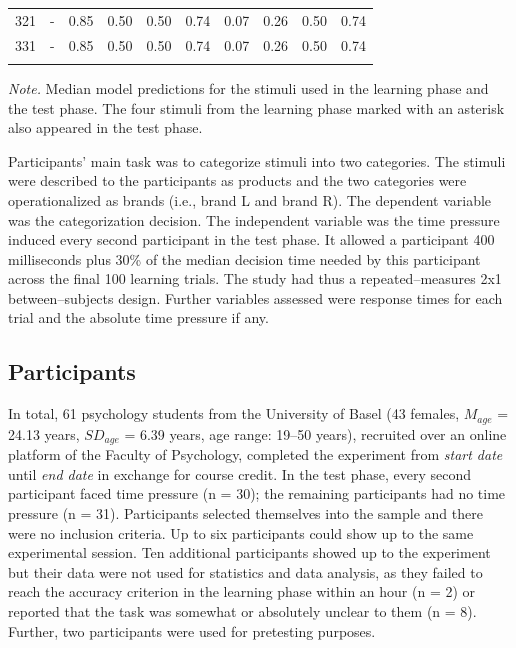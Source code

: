 \documentclass[a4paper,man,natbib]{apa6}
\begin{document}
\begin{table}
\begin{center}
\begin{threeparttable}
\begin{tabular}{cccccccccc}
321 & - & 0.85 & 0.50 & 0.50 & 0.74 & 0.07 & 0.26 & 0.50 & 0.74\\
331 & - & 0.85 & 0.50 & 0.50 & 0.74 & 0.07 & 0.26 & 0.50 & 0.74\\
\bottomrule
\addlinespace
\end{tabular}
\begin{tablenotes}[para]
\textit{Note.} Median model predictions for the stimuli used in the learning phase and the test phase. The four stimuli from the learning phase marked with an asterisk also appeared in the test phase.
\end{tablenotes}
\end{threeparttable}
\end{center}
\end{table}

Participants' main task was to categorize stimuli into two categories. The stimuli were described to the participants as products and the two categories were operationalized as brands (i.e., brand L and brand R). The dependent variable was the categorization decision. The independent variable was the time pressure induced every second participant in the test phase. It allowed a participant 400 milliseconds plus 30\% of the median decision time needed by this participant across the final 100 learning trials. The study had thus a repeated--measures 2x1 between--subjects design. Further variables assessed were response times for each trial and the absolute time pressure if any.

\subsection{Participants}
In total, 61 psychology students from the University of Basel (43 females, $M_{age}$ = 24.13 years, $SD_{age}$ = 6.39 years, age range: 19--50 years), recruited over an online platform of the Faculty of Psychology, completed the experiment from \textit{start date} until \textit{end date} in exchange for course credit. In the test phase, every second participant faced time pressure (n = 30); the remaining participants had no time pressure (n = 31).
Participants selected themselves into the sample and there were no inclusion criteria. Up to six participants could show up to the same experimental session. Ten additional participants showed up to the experiment but their data were not used for statistics and data analysis, as they failed to reach the accuracy criterion in the learning phase within an hour (n = 2) or reported that the task was somewhat or absolutely unclear to them (n = 8). Further, two participants were used for pretesting purposes. 
\end{document}
